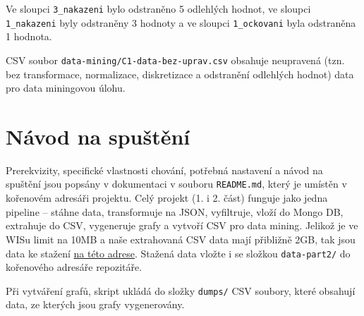 \documentclass[12pt]{article}
\begin{document}
Ve sloupci \texttt{3\_nakazeni} bylo odstraněno 5 odlehlých hodnot, ve sloupci \texttt{1\_nakazeni} byly odstraněny 3 hodnoty a ve sloupci \texttt{1\_ockovani} byla odstraněna 1 hodnota.

CSV soubor \texttt{data-mining/C1-data-bez-uprav.csv} obsahuje neupravená (tzn. bez transformace, normalizace, diskretizace a odstranění odlehlých hodnot) data pro data miningovou úlohu.

\section{Návod na spuštění}
Prerekvizity, specifické vlastnosti chování, potřebná nastavení a návod na spuštění jsou popsány v dokumentaci v souboru \texttt{README.md}, který je umístěn v kořenovém adresáři projektu. Celý projekt (1. i 2. část) funguje jako jedna pipeline -- stáhne data, transformuje na JSON, vyfiltruje, vloží do Mongo DB, extrahuje do CSV, vygeneruje grafy a vytvoří CSV pro data mining. Jelikož je ve WISu limit na 10MB a naše extrahovaná CSV data mají přibližně 2GB, tak jsou data ke stažení \href{https://drive.google.com/drive/folders/1RmdLxXcsgwmM98bOfyiooRcAh_S5xCwm?usp=sharing}{na této adrese}. Stažená data vložte i se složkou \texttt{data-part2/} do kořenového adresáře repozitáře.

Při vytváření grafů, skript ukládá do složky \texttt{dumps/} CSV soubory, které obsahují data, ze kterých jsou grafy vygenerovány.
\end{document}
